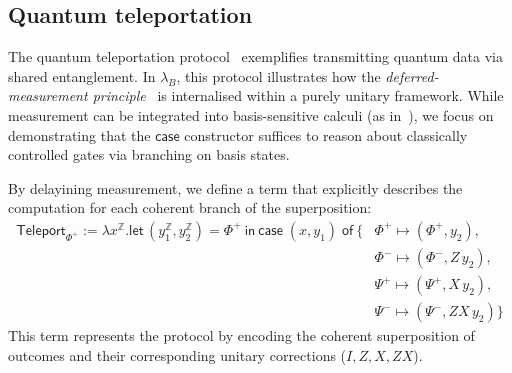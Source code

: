 \documentclass[a4paper,UKenglish,numberwithinsect,pdfa,anonymous]{lipics-v2021}
\theoremstyle{restatestyle}
\def\Pair#1#2{(#1,#2)} %
\def\Lam#1#2#3{\lambda#1^{#2}{.}#3} %
\def\letkeyword{\mathsf{let}}
\def\inkeyword{\mathsf{in}}
\def\LetP#1#2#3#4#5#6{\letkeyword\,\Pair{#1^{#2}}{#3^{#4}}=#5~\inkeyword~#6}
\newcommand\B{\mathbb Z}
\newcommand\XB{\mathbb X}
\newcommand{\lambdaB}{\lambda_B}
\newcommand\basis[1]{\ensuremath{\flat_{#1}}}
\begin{document}
%

\subsection{Quantum teleportation}\label{sec:teleportation}
The quantum teleportation protocol~\cite{PhysRevLett.70.1895} exemplifies transmitting quantum data via shared entanglement. In $\lambdaB$, this protocol illustrates how the \emph{deferred-measurement principle}~\cite[\S 4.4]{NC00} is internalised within a purely unitary framework. While measurement can be integrated into basis-sensitive calculi (as in~\cite{DiazcaroMonzonAPLAS25}), we focus on demonstrating that the $\mathsf{case}$ constructor suffices to reason about classically controlled gates via branching on basis states.

By delayining measurement, we define a term that explicitly describes the computation for each coherent branch of the superposition:
\begin{align*}
\mathsf{Teleport}_{\Phi^+} :=
  \Lam{x}{\B}{
    \LetP{y_1}{\B}{y_2}{\B}{\Phi^{+}}{
    \mathsf{case}\; \Pair{x}{y_1}\; \mathsf{of}\ \{  
    &\Phi^{+} \mapsto \Pair{\Phi^{+}}{y_2},\;\\
    &\Phi^{-} \mapsto \Pair{\Phi^{-}}{Z\,y_2},\;\\
    &\Psi^{+} \mapsto \Pair{\Psi^{+}}{X\,y_2},\;\\
    &\Psi^{-} \mapsto \Pair{\Psi^{-}}{ZX\,y_2} \}
    }
  }
\end{align*}
This term represents the protocol by encoding the coherent superposition of outcomes and their corresponding unitary corrections ($I, Z, X, ZX$). 
\end{document}
